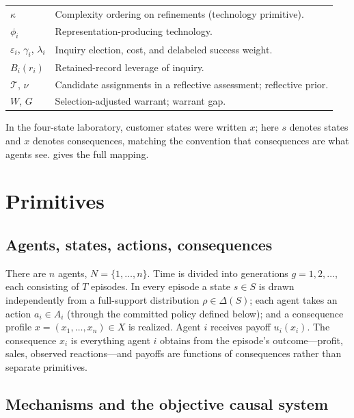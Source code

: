 \documentclass[11pt]{article}
\begin{document}
\begin{center}
\begin{tabularx}{\textwidth}{@{}>{\raggedright\arraybackslash}p{}X@{}}
$\kappa$ & Complexity ordering on refinements (technology primitive). \\
$\phi_i$ & Representation-producing technology. \\
$\varepsilon_i$, $\gamma_i$, $\lambda_i$ & Inquiry election, cost, and delabeled success weight. \\
$B_i(r_i)$ & Retained-record leverage of inquiry. \\
$\mathcal T$, $\nu$ & Candidate assignments in a reflective assessment; reflective prior. \\
$W$, $G$ & Selection-adjusted warrant; warrant gap. \\
\bottomrule
\end{tabularx}
\end{center}

In the four-state laboratory, customer states were written $x$; here $s$
denotes states and $x$ denotes consequences, matching the convention that
consequences are what agents see.   gives the full mapping.

\section{Primitives}
\label{sec:primitives}

\subsection{Agents, states, actions, consequences}

There are $n$ agents, $N=\{1,\dots,n\}$.  Time is divided into generations
$g=1,2,\dots$, each consisting of $T$ episodes.  In every episode a state
$s\in S$ is drawn independently from a full-support distribution
$\rho\in\Delta(S)$; each agent takes an action $a_i\in A_i$ (through the
committed policy defined below); and a consequence profile
$x=(x_1,\dots,x_n)\in X$ is realized.  Agent $i$ receives payoff $u_i(x_i)$.
The consequence $x_i$ is everything agent $i$ obtains from the episode's
outcome---profit, sales, observed reactions---and payoffs are functions of
consequences rather than separate primitives.

\subsection{Mechanisms and the objective causal system}
\label{sec:mechanisms}
\end{document}
